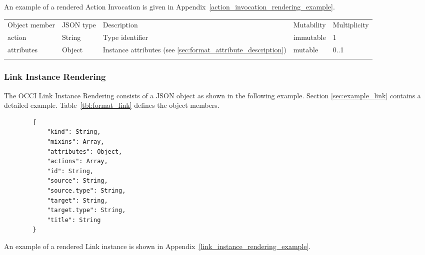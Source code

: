\documentclass[10pt,a4paper]{article}
\begin{document}
An example of a rendered Action Invocation is given in Appendix~\ref{action_invocation_rendering_example}.

 {
    \begin{tabularx}{\textwidth}{llXll}
    \toprule
    Object member & JSON type & Description & Mutability & Multiplicity \\
    \colrule
    action & String & Type identifier & immutable & 1 \\

    attributes & Object & Instance attributes (see
\ref{sec:format_attribute_description}) & mutable & 0..1 \\
    \botrule
    \end{tabularx}
}


\subsubsection{Link Instance Rendering}
\label{sec:format_link}

The OCCI Link Instance Rendering consists of a JSON object as shown in the
following example. Section \ref{sec:example_link} contains a detailed example.
Table~\ref{tbl:format_link} defines the object members.
\begin{lstlisting}
        {
            "kind": String,
            "mixins": Array,
            "attributes": Object,
            "actions": Array,
            "id": String,
            "source": String,
            "source.type": String,
            "target": String,
            "target.type": String,
            "title": String
        }
\end{lstlisting}

An example of a rendered Link instance is shown in Appendix~\ref{link_instance_rendering_example}.
\end{document}
